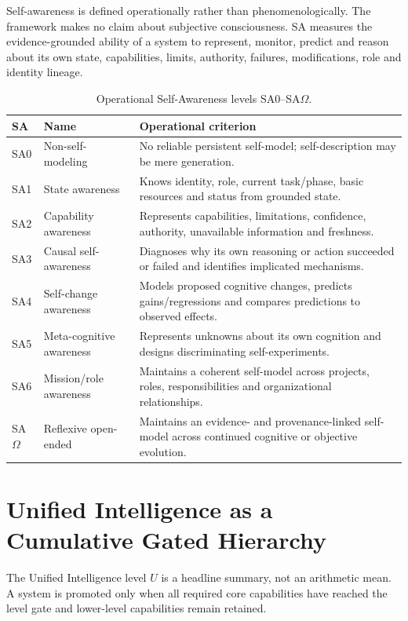 \documentclass[11pt]{article}
\theoremstyle{definition}
\newcommand{\Om}{\ensuremath{\Omega}}
\begin{document}
Self-awareness is defined operationally rather than phenomenologically. The framework makes no claim about subjective consciousness. SA measures the evidence-grounded ability of a system to represent, monitor, predict and reason about its own state, capabilities, limits, authority, failures, modifications, role and identity lineage.

\begin{table}[H]
\centering\small
\begin{tabularx}{\textwidth}{@{}llY@{}}
\toprule
SA & Name & Operational criterion \\
\midrule
SA0 & Non-self-modeling & No reliable persistent self-model; self-description may be mere generation. \\
SA1 & State awareness & Knows identity, role, current task/phase, basic resources and status from grounded state. \\
SA2 & Capability awareness & Represents capabilities, limitations, confidence, authority, unavailable information and freshness. \\
SA3 & Causal self-awareness & Diagnoses why its own reasoning or action succeeded or failed and identifies implicated mechanisms. \\
SA4 & Self-change awareness & Models proposed cognitive changes, predicts gains/regressions and compares predictions to observed effects. \\
SA5 & Meta-cognitive awareness & Represents unknowns about its own cognition and designs discriminating self-experiments. \\
SA6 & Mission/role awareness & Maintains a coherent self-model across projects, roles, responsibilities and organizational relationships. \\
SA\Om{} & Reflexive open-ended & Maintains an evidence- and provenance-linked self-model across continued cognitive or objective evolution. \\
\bottomrule
\end{tabularx}
\caption{Operational Self-Awareness levels SA0--SA\Om{}.}
\label{tab:sa}
\end{table}

\section{Unified Intelligence as a Cumulative Gated Hierarchy}

The Unified Intelligence level $U$ is a headline summary, not an arithmetic mean. A system is promoted only when all required core capabilities have reached the level gate and lower-level capabilities remain retained.
\end{document}
